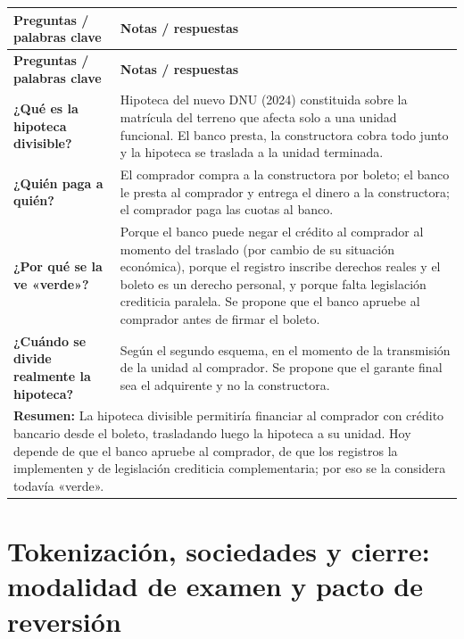 \documentclass[12pt,oneside]{book}
\newcommand{\cornellresumen}[1]{%
  \multicolumn{2}{p{\dimexpr0.89\textwidth+2\tabcolsep\relax}}{\textbf{Resumen:} #1}\\}
\begin{document}
\begin{longtable}{p{}p{}}
\toprule
\textbf{Preguntas / palabras clave} & \textbf{Notas / respuestas} \\
\midrule
\endfirsthead
\toprule
\textbf{Preguntas / palabras clave} & \textbf{Notas / respuestas} \\
\midrule
\endhead

\textbf{¿Qué es la hipoteca divisible?} &
Hipoteca del nuevo DNU (2024) constituida sobre la matrícula del terreno que afecta solo a una unidad funcional. El banco presta, la constructora cobra todo junto y la hipoteca se traslada a la unidad terminada. \\[0.6em]

\textbf{¿Quién paga a quién?} &
El comprador compra a la constructora por boleto; el banco le presta al comprador y entrega el dinero a la constructora; el comprador paga las cuotas al banco. \\[0.6em]

\textbf{¿Por qué se la ve «verde»?} &
Porque el banco puede negar el crédito al comprador al momento del traslado (por cambio de su situación económica), porque el registro inscribe derechos reales y el boleto es un derecho personal, y porque falta legislación crediticia paralela. Se propone que el banco apruebe al comprador antes de firmar el boleto. \\[0.6em]

\textbf{¿Cuándo se divide realmente la hipoteca?} &
Según el segundo esquema, en el momento de la transmisión de la unidad al comprador. Se propone que el garante final sea el adquirente y no la constructora. \\

\midrule
\cornellresumen{La hipoteca divisible permitiría financiar al comprador con crédito bancario desde el boleto, trasladando luego la hipoteca a su unidad. Hoy depende de que el banco apruebe al comprador, de que los registros la implementen y de legislación crediticia complementaria; por eso se la considera todavía «verde».}
\bottomrule
\end{longtable}

\chapter[Tokenización y cierre]{Tokenización, sociedades y cierre: modalidad de examen y pacto de reversión}
\end{document}
